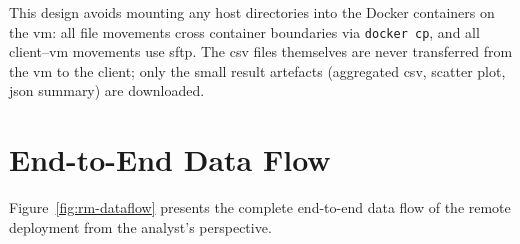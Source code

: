 This design avoids mounting any host directories into the Docker containers on the \gls{vm}:
all file movements cross container boundaries via \texttt{docker cp}, and all client--\gls{vm}
movements use \gls{sftp}.  The \gls{csv} files themselves are never transferred from the
\gls{vm} to the client; only the small result artefacts (aggregated \gls{csv}, scatter plot,
\gls{json} summary) are downloaded.

\section{End-to-End Data Flow}
\label{sec:rm-dataflow}

Figure~\ref{fig:rm-dataflow} presents the complete end-to-end data flow of the remote deployment
from the analyst's perspective.

